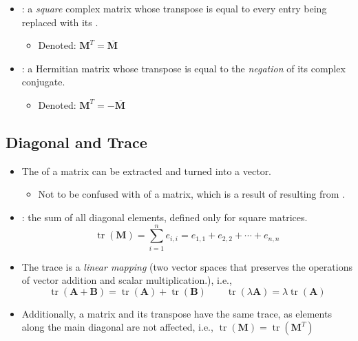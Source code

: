 \begin{itemize}
\begin{itemize}
\begin{itemize}
      \item {}: a \emph{square} complex matrix whose transpose is equal to every entry being replaced with its \hyperref[Complex conjugate]{}. 
        \begin{itemize}
          \item Denoted: \(\bm{M}^T={\overline{\bm{M}\,}}\)
        \end{itemize}
      \item {}: a Hermitian matrix whose transpose is equal to the \emph{negation} of its complex conjugate.
      \begin{itemize}
        \item Denoted: \(\bm{M}^T=-{\overline{\bm{M}\,}}\)
      \end{itemize}
    \end{itemize}
  \end{itemize}

  \subsection{Diagonal and Trace}\label{Diagonal and Trace}
  \begin{itemize}
    \item The \hyperref[Diagonal]{} of a matrix can be extracted and turned into a vector.
      \begin{itemize}
        \item Not to be confused with \hyperref[tbd]{} of a matrix, which is a result of \hyperref[tbd]{} resulting from \hyperref[tbd]{}.
      \end{itemize}
    \item {}: the sum of all diagonal elements, defined only for square matrices.
    \[%
    \operatorname{tr}(\bm{M}) = \sum_{i = 1}^{n} e_{i,i} = e_{1,1} + e_{2,2} + \cdots + e_{n,n}
    \]%
    \item The trace is a \emph{linear mapping} (two vector spaces that preserves the operations of vector addition and scalar multiplication.), i.e.,
    \[%
      \operatorname{tr}(\bm{A + B})  =  \operatorname{tr}(\bm{A}) + \operatorname{tr}(\bm{B})  \qquad
      \operatorname{tr}(\lambda\bm{A}) = \lambda\operatorname{tr}(\bm{A}) 
    \]%
    \item Additionally, a matrix and its transpose have the same trace, as elements along the main diagonal are not affected, i.e., \( \operatorname{tr}(\bm{M}) = \operatorname{tr}(\bm{M}^T)\) 
  \end{itemize}


\end{itemize}
